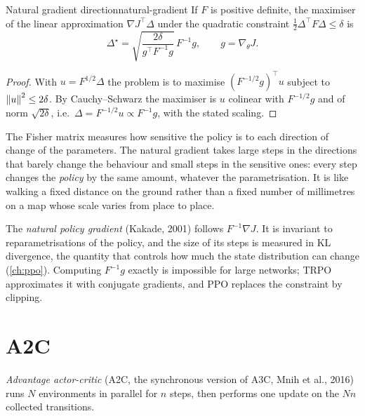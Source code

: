\begin{proposition}{Natural gradient direction}{natural-gradient}
  If $F$ is positive definite, the maximiser of the linear approximation
  $\nabla J^\top \Delta$ under the quadratic constraint $\frac{1}{2}
  \Delta^\top F \Delta \leq \delta$ is
  \begin{equation}
    \Delta^\star = \sqrt{\frac{2 \delta}{g^\top F^{-1} g}}\, F^{-1} g,
    \qquad g = \nabla_\theta J.
  \end{equation}
\end{proposition}

\begin{proof}
  With $u = F^{1/2} \Delta$ the problem is to maximise $(F^{-1/2} g)^\top u$
  subject to $\left\lVert u \right\rVert^2 \leq 2 \delta$. By Cauchy--Schwarz the maximiser is
  $u$ colinear with $F^{-1/2} g$ and of norm $\sqrt{2 \delta}$, i.e.\
  $\Delta = F^{-1/2} u \propto F^{-1} g$, with the stated scaling.
\end{proof}

\begin{intuition}
  The Fisher matrix measures how sensitive the policy is to each direction
  of change of the parameters. The natural gradient takes large steps in the
  directions that barely change the behaviour and small steps in the
  sensitive ones: every step changes the \emph{policy} by the same amount,
  whatever the parametrisation. It is like walking a fixed distance on the
  ground rather than a fixed number of millimetres on a map whose scale
  varies from place to place.
\end{intuition}

The \emph{natural policy gradient} (Kakade, 2001) follows $F^{-1} \nabla
J$. It is invariant to reparametrisations of the policy, and the size of
its steps is measured in KL divergence, the quantity that controls how much
the state distribution can change (\cref{ch:ppo}). Computing $F^{-1} g$
exactly is impossible for large networks; TRPO approximates it with
conjugate gradients, and PPO replaces the constraint by clipping.

\section{A2C}

\emph{Advantage actor-critic} (A2C, the synchronous version of A3C, Mnih et
al., 2016) runs $N$ environments in parallel for $n$ steps, then performs
one update on the $N n$ collected transitions.

